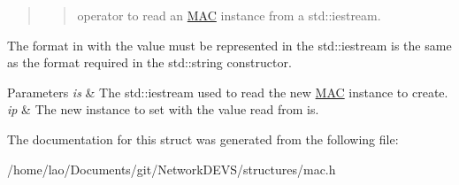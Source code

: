 \begin{quote}
\begin{quote}
operator to read an \hyperlink{structMAC}{M\+AC} instance from a std\+::iestream. \end{quote}
\end{quote}


The format in with the value must be represented in the std\+::iestream is the same as the format required in the std\+::string constructor.


\begin{DoxyParams}{Parameters}
{\em is} & The std\+::iestream used to read the new \hyperlink{structMAC}{M\+AC} instance to create. \\
\hline
{\em ip} & The new instance to set with the value read from is. \\
\hline
\end{DoxyParams}


The documentation for this struct was generated from the following file\+:\begin{DoxyCompactItemize}
\item 
/home/lao/\+Documents/git/\+Network\+D\+E\+V\+S/structures/mac.\+h\end{DoxyCompactItemize}
